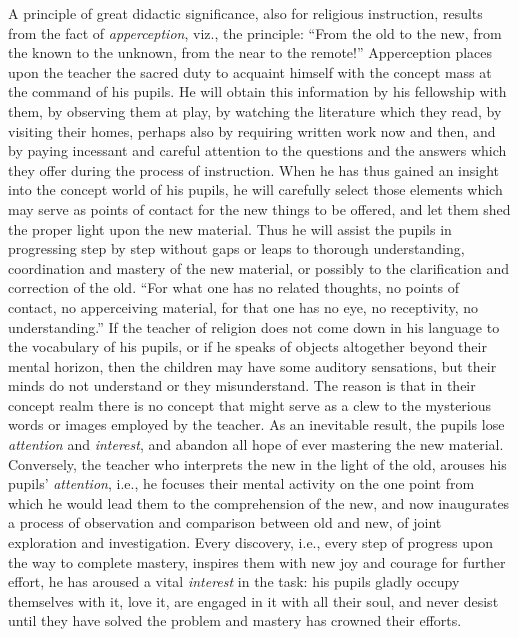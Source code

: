 A principle of great didactic significance, also for religious instruction, results from the fact of \emph{apperception}, viz., the principle: “From the old to the new, from the known to the unknown, from the near to the remote!” Apperception places upon the teacher the sacred duty to acquaint himself with the concept mass at the command of his pupils. He will obtain this information by his fellowship with them, by observing them at play, by watching the literature which they read, by visiting their homes, perhaps also by requiring written work now and then, and by paying incessant and careful attention to the questions and the answers which they offer during the process of instruction. When he has thus gained an insight into the concept world of his pupils,
he will carefully select those elements which may serve as points of contact for the new things to be offered, and let them shed the proper light upon the new material. Thus he will assist the pupils in progressing step by step without gaps or leaps to thorough understanding, coordination and mastery of the new material, or possibly to the clarification and correction of the old. “For what one has no related thoughts, no points of contact, no apperceiving material, for that one has no eye, no receptivity, no understanding.” If the teacher of religion does not come down in his language to the vocabulary of his pupils, or if he speaks of objects altogether beyond their mental horizon, then the children may have some auditory sensations, but their minds do not understand or they misunderstand. The reason is that in their concept realm there is no concept that might serve as a clew to the mysterious words or images employed by the teacher. As an inevitable result, the pupils lose \emph{attention} and \emph{interest}, and abandon all hope of ever mastering the new material. Conversely, the teacher who interprets the new in the light of the old, arouses his pupils’ \emph{attention}, i.e., he focuses their mental activity on the one point from which he would lead them to the comprehension of the new, and now inaugurates a process of observation and comparison between old and new, of joint exploration and investigation. Every discovery, i.e., every step of progress upon the way to complete mastery, inspires them with new joy and courage for further effort, he has aroused a vital \emph{interest} in the task: his pupils gladly occupy themselves with it, love it, are engaged in it with all their soul, and never desist until they have solved the problem and mastery has crowned their efforts.

